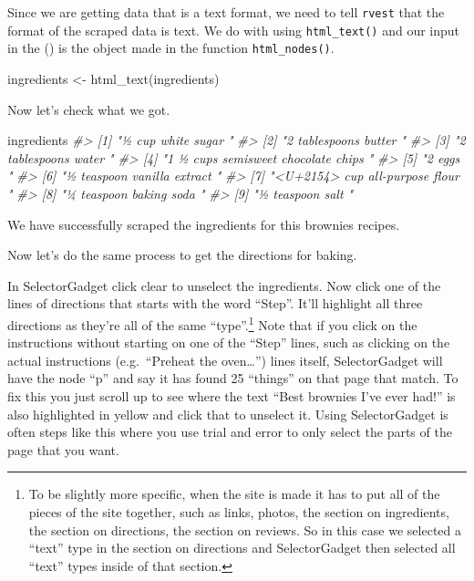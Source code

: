 \documentclass[
]{krantz}
\makeatletter
\newenvironment{Shaded}{\begin{snugshade}}{\end{snugshade}}
\newcommand{\CommentTok}[1]{\textcolor[rgb]{0.37,0.37,0.37}{\textit{#1}}}
\newcommand{\FunctionTok}[1]{\textcolor[rgb]{0,0,0}{#1}}
\newcommand{\NormalTok}[1]{#1}
\newcommand{\OtherTok}[1]{\textcolor[rgb]{0.37,0.37,0.37}{#1}}
\newenvironment{kframe}{%
\medskip{}
\setlength{\fboxsep}{.8em}
 \def\at@end@of@kframe{}%
 \ifinner\ifhmode%
  \def\at@end@of@kframe{\end{minipage}}%
  \begin{minipage}{\columnwidth}%
 \fi\fi%
 \def\FrameCommand##1{\hskip\@totalleftmargin \hskip-\fboxsep
 \colorbox{shadecolor}{##1}\hskip-\fboxsep
     \hskip-\linewidth \hskip-\@totalleftmargin \hskip\columnwidth}%
 \MakeFramed {\advance\hsize-\width
   \@totalleftmargin\z@ \linewidth\hsize
   \@setminipage}}%
 {\par\unskip\endMakeFramed%
 \at@end@of@kframe}
\renewenvironment{Shaded}{\begin{kframe}}{\end{kframe}}
\makeatother
\begin{document}
Since we are getting data that is a text format, we need to
tell \texttt{rvest} that the format of the scraped data is
text. We do with using \texttt{html\_text()} and our input
in the () is the object made in the function
\texttt{html\_nodes()}.

\begin{Shaded}
\begin{Highlighting}[]
\NormalTok{ingredients }\OtherTok{\textless{}{-}} \FunctionTok{html\_text}\NormalTok{(ingredients)}
\end{Highlighting}
\end{Shaded}

Now let's check what we got.

\begin{Shaded}
\begin{Highlighting}[]
\NormalTok{ingredients}
\CommentTok{\#\textgreater{} [1] "½ cup white sugar "                 }
\CommentTok{\#\textgreater{} [2] "2 tablespoons butter "              }
\CommentTok{\#\textgreater{} [3] "2 tablespoons water "               }
\CommentTok{\#\textgreater{} [4] "1 ½ cups semisweet chocolate chips "}
\CommentTok{\#\textgreater{} [5] "2 eggs "                            }
\CommentTok{\#\textgreater{} [6] "½ teaspoon vanilla extract "        }
\CommentTok{\#\textgreater{} [7] "\textless{}U+2154\textgreater{} cup all{-}purpose flour "    }
\CommentTok{\#\textgreater{} [8] "¼ teaspoon baking soda "            }
\CommentTok{\#\textgreater{} [9] "½ teaspoon salt "}
\end{Highlighting}
\end{Shaded}

We have successfully scraped the ingredients for this
brownies recipes.

Now let's do the same process to get the directions for
baking.

In SelectorGadget click clear to unselect the ingredients.
Now click one of the lines of directions that starts with
the word ``Step''. It'll highlight all three directions as
they're all of the same ``type''.\footnote{To be slightly
  more specific, when the site is made it has to put all of
  the pieces of the site together, such as links, photos,
  the section on ingredients, the section on directions, the
  section on reviews. So in this case we selected a ``text''
  type in the section on directions and SelectorGadget then
  selected all ``text'' types inside of that section.} Note
that if you click on the instructions without starting on
one of the ``Step'' lines, such as clicking on the actual
instructions (e.g.~``Preheat the oven\ldots{}'') lines
itself, SelectorGadget will have the node ``p'' and say it
has found 25 ``things'' on that page that match. To fix this
you just scroll up to see where the text ``Best brownies
I've ever had!'' is also highlighted in yellow and click
that to unselect it. Using SelectorGadget is often steps
like this where you use trial and error to only select the
parts of the page that you want.
\end{document}
